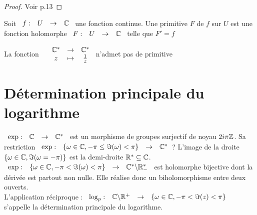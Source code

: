 \documentclass[]{report}
\begin{document}
\begin{proof}{}{}
    Voir p.13
\end{proof}

\begin{df}{}{}
    Soit $\begin{array}{ccccc}
f : & U & \to & \mathbb{C}
\end{array}$ une fonction continue. Une primitive $F$ de $f$ sur $U$ est une fonction holomorphe $\begin{array}{ccccc}
F : & U & \to & \mathbb{C}
\end{array}$ telle que $F'=f$
\end{df}

\begin{re}{}{}
    La fonction $\begin{array}{ccccc}
& \mathbb{C}^* & \to & \mathbb{C}^* \\
& z & \mapsto & \frac{1}{z}
\end{array}$ n'admet pas de primitive
\end{re}

\section*{Détermination principale du logarithme}

    $\begin{array}{ccccc}
\exp : & \mathbb{C} & \to & \mathbb{C}^* \\
\end{array}$ est un morphisme de groupes surjectif de noyau $2i\pi\mathbb{Z}$. Sa restriction $\begin{array}{ccccc}
\exp : & \left\{ \omega\in\mathbb{C},-\pi\le\Im(\omega)<\pi\right\} & \to & \mathbb{C}^*
\end{array}$? L'image de la droite $\left\{\omega\in\mathbb{C},\Im(\omega=-\pi)\right\}$ est la demi-droite $\mathbb{R}^*\subseteq \mathbb{C}$.\\
$\begin{array}{ccccc}
\exp : & \left\{ \omega\in\mathbb{C},-\pi<\Im(\omega)<\pi\right\} & \to & \mathbb{C}^*\backslash\mathbb{R}^*_- \\
\end{array}$ est holomorphe bijective dont la dérivée est partout non nulle. Elle réalise donc un biholomorphisme entre deux ouverts.\\
L'application réciproque : $\begin{array}{ccccc}
\log_p : & \mathbb{C}\backslash\mathbb{R}^+ & \to & \left\{\omega\in\mathbb{C},-\pi<\Im(z)<\pi\right\} \\
\end{array}$ s'appelle la détermination principale du logarithme.
\end{document}
